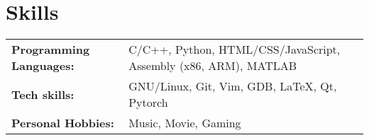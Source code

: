 \documentclass{cv_en}
\begin{document}
\section{Skills}
\begin{tabular}[t]{ll}
  \textbf{Programming Languages:} & C/C++, Python, HTML/CSS/JavaScript, Assembly (x86, ARM), MATLAB\\
  \textbf{Tech skills:} & GNU/Linux, Git, Vim, GDB, \LaTeX, Qt,  Pytorch\\
  \textbf{Personal Hobbies:} & Music, Movie, Gaming 
\end{tabular}
\end{document}
